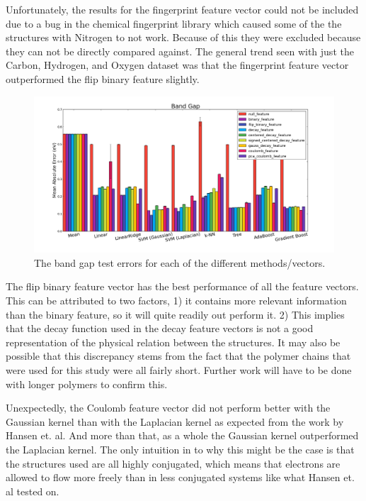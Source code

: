 \documentclass[10pt, oneside]{article}   	%
\begin{document}
Unfortunately, the results for the fingerprint feature vector could not be included due to a bug in the chemical fingerprint library which caused some of the the structures with Nitrogen to not work. Because of this they were excluded because they can not be directly compared against. The general trend seen with just the Carbon, Hydrogen, and Oxygen dataset was that the fingerprint feature vector outperformed the flip binary feature slightly.

\begin{figure}[H]
\begin{center}
\includegraphics [width=.8\textwidth]{gap_results.png}
\caption{The band gap test errors for each of the different methods/vectors.}\label{gap}
\end{center}
\end{figure}

The flip binary feature vector has the best performance of all the feature vectors. This can be attributed to two factors, 1) it contains more relevant information than the binary feature, so it will quite readily out perform it. 2) This implies that the decay function used in the decay feature vectors is not a good representation of the physical relation between the structures. It may also be possible that this discrepancy stems from the fact that the polymer chains that were used for this study were all fairly short. Further work will have to be done with longer polymers to confirm this.

Unexpectedly, the Coulomb feature vector did not perform better with the Gaussian kernel than with the Laplacian kernel as expected from the work by Hansen et. al\cite{Hansen}. And more than that, as a whole the Gaussian kernel outperformed the Laplacian kernel. The only intuition in to why this might be the case is that the structures used are all highly conjugated, which means that electrons are allowed to flow more freely than in less conjugated systems like what Hansen et. al tested on.
\end{document}
